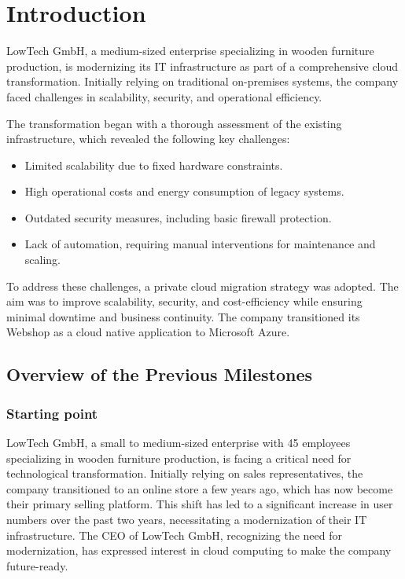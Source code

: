 \documentclass{llncs}
\begin{document}
\section{Introduction}

LowTech GmbH, a medium-sized enterprise specializing in wooden furniture production, is modernizing its IT infrastructure as part of a comprehensive cloud transformation. Initially relying on traditional on-premises systems, the company faced challenges in scalability, security, and operational efficiency.

The transformation began with a thorough assessment of the existing infrastructure, which revealed the following key challenges:
\begin{itemize}
    \item Limited scalability due to fixed hardware constraints.
    \item High operational costs and energy consumption of legacy systems.
    \item Outdated security measures, including basic firewall protection.
    \item Lack of automation, requiring manual interventions for maintenance and scaling.
\end{itemize}

To address these challenges, a private cloud migration strategy was adopted. The aim was to improve scalability, security, and cost-efficiency while ensuring minimal downtime and business continuity.
The company transitioned its Webshop as a cloud native application to Microsoft Azure.

\subsection{Overview of the Previous Milestones}

\subsubsection{Starting point}
LowTech GmbH, a small to medium-sized enterprise with 45 employees specializing in wooden furniture production, is facing a critical need for technological transformation.
Initially relying on sales representatives, the company transitioned to an online store a few years ago, which has now become their primary selling platform.
This shift has led to a significant increase in user numbers over the past two years, necessitating a modernization of their IT infrastructure.
The CEO of LowTech GmbH, recognizing the need for modernization, has expressed interest in cloud computing to make the company future-ready.
\end{document}
